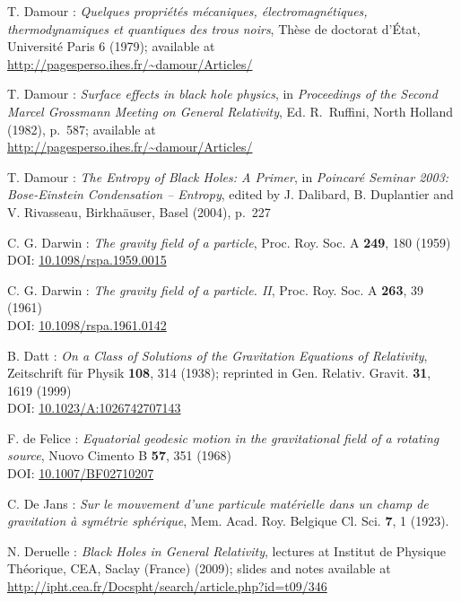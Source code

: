\begin{thebibliography}{123}
T. Damour : {\em Quelques propri\'et\'es m\'ecaniques, \'electromagn\'etiques,
thermo\-dy\-na\-mi\-ques et quantiques des trous noirs},
Th\`ese de doctorat d'\'Etat, Universit\'e Paris 6 (1979); available at\\
\url{http://pagesperso.ihes.fr/~damour/Articles/}

T. Damour : {\em Surface effects in black hole physics},
in {\em Proceedings of the Second Marcel Grossmann Meeting on General
Relativity}, Ed. R.~Ruffini, North Holland (1982), p.~587; available at\\
\url{http://pagesperso.ihes.fr/~damour/Articles/}

T. Damour : {\em The Entropy of Black Holes: A Primer},
in {\em Poincaré Seminar 2003: Bose-Einstein Condensation -- Entropy},
edited by J. Dalibard, B. Duplantier and V. Rivasseau, Birkha\"auser, Basel (2004),
p.~227

C. G. Darwin : {\em The gravity field of a particle},
Proc. Roy. Soc. A {\bf 249}, 180 (1959)\\
DOI: \href{https://doi.org/10.1098/rspa.1959.0015}{10.1098/rspa.1959.0015}

C. G. Darwin : {\em The gravity field of a particle. II},
Proc. Roy. Soc. A {\bf 263}, 39 (1961)\\
DOI: \href{https://doi.org/10.1098/rspa.1961.0142}{10.1098/rspa.1961.0142}

B. Datt :
{\em On a Class of Solutions of the Gravitation Equations of Relativity},
Zeitschrift für Physik {\bf 108}, 314 (1938);
reprinted in Gen. Relativ. Gravit. {\bf 31}, 1619 (1999)\\
DOI: \href{https://doi.org/10.1023/10.1023/A:1026742707143}{10.1023/A:1026742707143}

F. de Felice :
{\em Equatorial geodesic motion in the gravitational field of a rotating source},
Nuovo Cimento B {\bf 57}, 351 (1968)\\
DOI: \href{https://doi.org/10.1007/BF02710207}{10.1007/BF02710207}

C. De Jans :
\emph{Sur le mouvement d'une particule matérielle dans un champ de gravitation à symétrie sphérique},
Mem. Acad. Roy. Belgique Cl. Sci. {\bf 7}, 1 (1923).

N. Deruelle : {\em Black Holes in General Relativity}, lectures at
Institut de Physique Théorique, CEA, Saclay (France) (2009); slides and notes
available at \\
\url{http://ipht.cea.fr/Docspht/search/article.php?id=t09/346}


\end{thebibliography}
